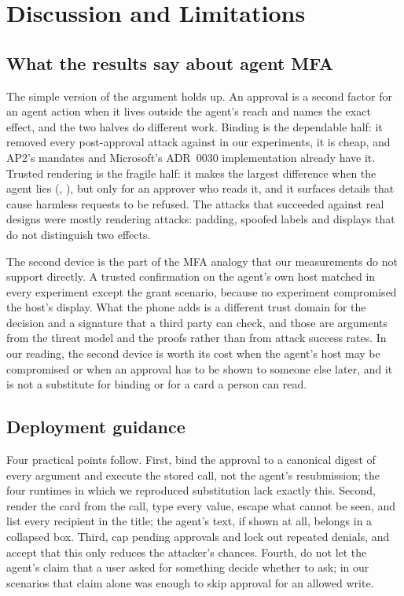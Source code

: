 \section{Discussion and Limitations}\label{sec:discussion}

\subsection{What the results say about agent MFA}

The simple version of the argument holds up. An approval is a second factor for an agent action when it lives
outside the agent's reach and names the exact effect, and the two halves do different work. Binding is the
dependable half: it removed every post-approval attack against \sys{} in our experiments, it is cheap, and AP2's
mandates and Microsoft's ADR~0030 implementation already have it. Trusted rendering is the fragile half: it makes the largest difference when the agent
lies (, ), but only for an approver who reads it, and it surfaces details that cause harmless requests
to be refused. The attacks that succeeded against real designs were mostly rendering attacks: padding, spoofed
labels and displays that do not distinguish two effects.

The second device is the part of the MFA analogy that our measurements do not support directly. A trusted
confirmation on the agent's own host matched \sys{} in every experiment except the grant scenario, because no
experiment compromised the host's display. What the phone adds is a different trust domain for the decision and a signature that a third
party can check, and those are arguments from the threat model and the proofs rather than from attack success
rates. In our reading, the second device is worth its cost when the agent's host may be
compromised or when an approval has to be shown to someone else later, and it is not a substitute for binding or
for a card a person can read.

\subsection{Deployment guidance}

Four practical points follow. First, bind the approval to a canonical digest of every argument and execute the
stored call, not the agent's resubmission; the four runtimes in which we reproduced substitution lack exactly
this. Second, render the card from the call, type every value, escape what cannot be seen, and list every
recipient in the title; the agent's text, if shown at all, belongs in a collapsed box. Third, cap pending approvals
and lock out repeated denials, and accept that this only reduces the attacker's chances. Fourth, do not let the
agent's claim that a user asked for something decide whether to ask; in our scenarios that claim alone was enough
to skip approval for an allowed write.

